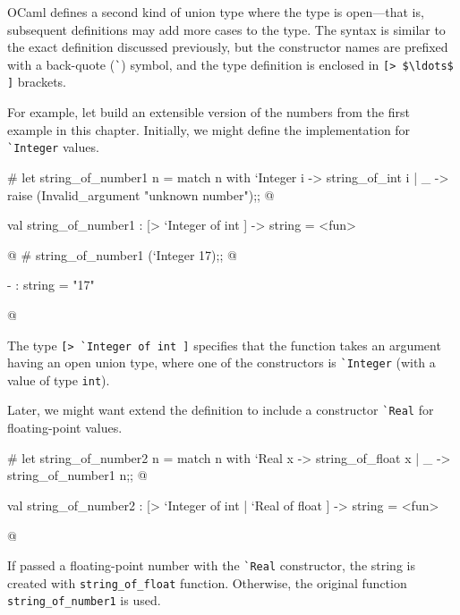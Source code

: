 \label{keyword:polymorphic-variants}

OCaml defines a second kind of union type where the type is
open---that is, subsequent definitions may add more cases to the type.
The syntax is similar to the exact definition discussed previously,
but the constructor names are prefixed with a back-quote
(\hbox{\lstinline/`/}) symbol, and the type definition is enclosed in
\hbox{\lstinline/[> $\ldots$ ]/} brackets.

\label{patterns:variants}
For example, let build an extensible version of the numbers from the first
example in this chapter.  Initially, we might define the implementation
for \hbox{\lstinline/`Integer/} values.

\begin{ocaml}
# let string_of_number1 n =
     match n with
        `Integer i -> string_of_int i
      | _ -> raise (Invalid_argument "unknown number");;
@
\begin{topoutput}
val string_of_number1 : [> `Integer of int ] -> string = <fun>
\end{topoutput}
@
# string_of_number1 (`Integer 17);;
@
\begin{topoutput}
- : string = "17"
\end{topoutput}
@
\end{ocaml}
%
The type \hbox{\lstinline/[> `Integer of int ]/} specifies that the function takes
an argument having an open union type, where one of the constructors
is \hbox{\lstinline/`Integer/} (with a value of type \hbox{\lstinline/int/}).

Later, we might want extend the definition to include
a constructor \hbox{\lstinline/`Real/} for floating-point values.

\begin{ocaml}
# let string_of_number2 n =
     match n with
        `Real x -> string_of_float x
      | _ -> string_of_number1 n;;
@
\begin{topoutput}
val string_of_number2 : [> `Integer of int | `Real of float ] -> string =
  <fun>
\end{topoutput}
@
\end{ocaml}
%
If passed a floating-point number with the \hbox{\lstinline/`Real/} constructor,
the string is created with \hbox{\lstinline/string_of_float/} function.
Otherwise, the original function \hbox{\lstinline/string_of_number1/} is used.

